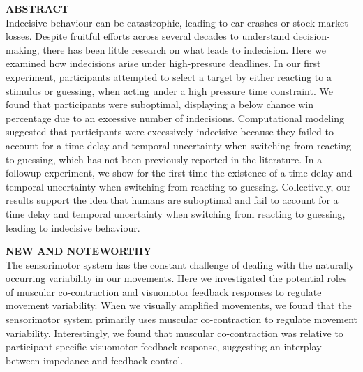 \documentclass[12pt,letterpaper]{article}
\begin{document}
\newpage
\doublespace %
\linenumbers %
\noindent \textbf{\large\textcolor{mydarkblue}{ABSTRACT}}
\vspace{2mm}
\\
Indecisive behaviour can be catastrophic, leading to car crashes or stock market losses. Despite fruitful efforts across several decades to understand decision-making, there has been little research on what leads to indecision. Here we examined how indecisions arise under high-pressure deadlines. In our first experiment, participants attempted to select a target by either reacting to a stimulus or guessing, when acting under a high pressure time constraint. We found that participants were suboptimal, displaying a below chance win percentage due to an excessive number of indecisions. Computational modeling suggested that participants were excessively indecisive because they failed to account for a time delay and temporal uncertainty when switching from reacting to guessing, which has not been previously reported in the literature. In a followup experiment, we show for the first time the existence of a time delay and temporal uncertainty when switching from reacting to guessing. Collectively, our results support the idea that humans are suboptimal and fail to account for a time delay and temporal uncertainty when switching from reacting to guessing, leading to indecisive behaviour.
\newpage

\noindent \textbf{\large\textcolor{mydarkblue}{NEW AND NOTEWORTHY}}
\vspace{2mm}
\\
The sensorimotor system has the constant challenge of dealing with the naturally occurring variability in our movements. Here we investigated the potential roles of muscular co-contraction and visuomotor feedback responses to regulate movement variability. When we visually amplified movements, we found that the sensorimotor system primarily uses muscular co-contraction to regulate movement variability. Interestingly, we found that muscular co-contraction was relative to participant-specific visuomotor feedback response, suggesting an interplay between impedance and feedback control.
\newpage
%
\pagestyle{fancy}
\fancyhead[R]{\emph{\textcolor{mydarkblue}{Regulation of Movement Variability via Impedance and Feedback Control
        }}}
\fancyfoot[C]{\textcolor{mydarkblue}{\thepage}}
\end{document}
